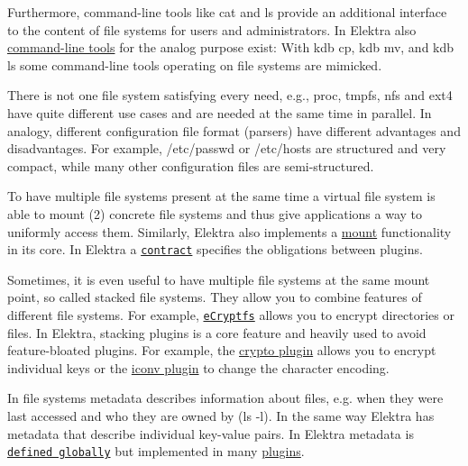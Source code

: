 Furthermore, command-\/line tools like {\ttfamily cat} and {\ttfamily ls} provide an additional interface to the content of file systems for users and administrators. In Elektra also \hyperlink{md_doc_help_kdb-introduction_doc_help_kdb-introduction_md}{command-\/line tools} for the analog purpose exist\+: With {\ttfamily kdb cp}, {\ttfamily kdb mv}, and {\ttfamily kdb ls} some command-\/line tools operating on file systems are mimicked.

There is not one file system satisfying every need, e.\+g., {\ttfamily proc}, {\ttfamily tmpfs}, {\ttfamily nfs} and {\ttfamily ext4} have quite different use cases and are needed at the same time in parallel. In analogy, different configuration file format (parsers) have different advantages and disadvantages. For example, {\ttfamily /etc/passwd} or {\ttfamily /etc/hosts} are structured and very compact, while many other configuration files are semi-\/structured.

To have multiple file systems present at the same time a virtual file system is able to mount (2) concrete file systems and thus give applications a way to uniformly access them. Similarly, Elektra also implements a \hyperlink{md_doc_help_elektra-mounting_doc_help_elektra-mounting_md}{mount} functionality in its core. In Elektra a \href{/home/markus/Projekte/Elektra/current/doc/CONTRACT.ini}{\tt contract} specifies the obligations between plugins.

Sometimes, it is even useful to have multiple file systems at the same mount point, so called {\ttfamily stacked} file systems. They allow you to combine features of different file systems. For example, \href{https://wiki.archlinux.org/index.php/ECryptfs}{\tt e\+Cryptfs} allows you to encrypt directories or files. In Elektra, stacking plugins is a core feature and heavily used to avoid feature-\/bloated plugins. For example, the \hyperlink{md_src_plugins_crypto_README_src_plugins_crypto_README_md}{crypto plugin} allows you to encrypt individual keys or the \hyperlink{md_src_plugins_iconv_README_src_plugins_iconv_README_md}{iconv plugin} to change the character encoding.

In file systems metadata describes information about files, e.\+g. when they were last accessed and who they are owned by ({\ttfamily ls -\/l}). In the same way Elektra has metadata that describe individual key-\/value pairs. In Elektra metadata is \href{/home/markus/Projekte/Elektra/current/doc/METADATA.ini}{\tt defined globally} but implemented in many \hyperlink{md_src_plugins_README_src_plugins_README_md}{plugins}.

